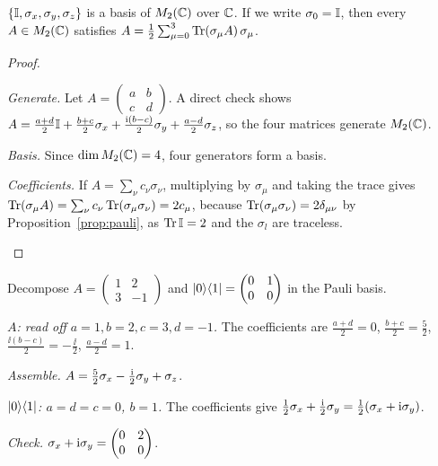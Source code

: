 \begin{theorem}\label{thm:paulibasis}
  $\{\mathbb{I},\sigma_x,\sigma_y,\sigma_z\}$ is a basis of $M_2(\mathbb{C})$ over $\mathbb{C}$. If we write $\sigma_0=\mathbb{I}$, then every $A\in M_2(\mathbb{C})$ satisfies $A=\tfrac12\sum_{\mu=0}^{3}\operatorname{Tr}(\sigma_\mu A)\,\sigma_\mu$.
\end{theorem}
\begin{proof}
  \begin{steps}
    \item \emph{Generate.} Let $A=\begin{pmatrix}a&b\\c&d\end{pmatrix}$. A direct check shows $A=\tfrac{a+d}{2}\mathbb{I}+\tfrac{b+c}{2}\sigma_x+\tfrac{\mathrm{i}(b-c)}{2}\sigma_y+\tfrac{a-d}{2}\sigma_z$, so the four matrices generate $M_2(\mathbb{C})$.
    \item \emph{Basis.} Since $\dim M_2(\mathbb{C})=4$, four generators form a basis.
    \item \emph{Coefficients.} If $A=\sum_\nu c_\nu\sigma_\nu$, multiplying by $\sigma_\mu$ and taking the trace gives $\operatorname{Tr}(\sigma_\mu A)=\sum_\nu c_\nu\operatorname{Tr}(\sigma_\mu\sigma_\nu)=2c_\mu$, because $\operatorname{Tr}(\sigma_\mu\sigma_\nu)=2\delta_{\mu\nu}$ by Proposition~\ref{prop:pauli}, as $\operatorname{Tr}\mathbb{I}=2$ and the $\sigma_l$ are traceless. \qedhere
  \end{steps}
\end{proof}

\begin{example}\label{ex:paulidecomp}
  Decompose $A=\begin{pmatrix}1&2\\3&-1\end{pmatrix}$ and $\left|0\right\rangle\!\left\langle1\right|=\begin{pmatrix}0&1\\0&0\end{pmatrix}$ in the Pauli basis.
\end{example}
\begin{solution}
  \begin{steps}
    \item \emph{$A$: read off $a=1,b=2,c=3,d=-1$.} The coefficients are $\tfrac{a+d}{2}=0$, $\tfrac{b+c}{2}=\tfrac52$, $\tfrac{\ii(b-c)}{2}=-\tfrac\ii2$, $\tfrac{a-d}{2}=1$.
    \item \emph{Assemble.} $A=\tfrac52\sigma_x-\tfrac{\mathrm{i}}2\sigma_y+\sigma_z$.
    \item \emph{$\left|0\right\rangle\!\left\langle1\right|$: $a=d=c=0$, $b=1$.} The coefficients give $\tfrac12\sigma_x+\tfrac{\mathrm{i}}2\sigma_y=\tfrac12(\sigma_x+\mathrm{i}\sigma_y)$.
    \item \emph{Check.} $\sigma_x+\mathrm{i}\sigma_y=\begin{pmatrix}0&2\\0&0\end{pmatrix}$.
  \end{steps}
\end{solution}

